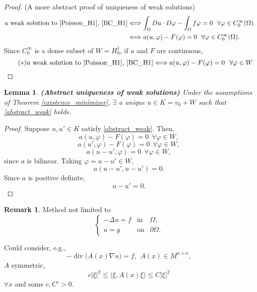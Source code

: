 \documentclass[12pt]{article}
\DeclareMathOperator{\diver}{div}
\newtheorem{lemma}{Lemma}[section]
\theoremstyle{definition}
\newtheorem*{remark}{Remark}
\begin{document}
\begin{proof}
(A more abstract proof of uniqueness of weak solutions)
\begin{align*}
u\text{ weak solution to \eqref{Poisson_H1}, \eqref{BC_H1}}&\Longleftrightarrow\int_{\Omega}Du\cdot D\varphi-\int_{\Omega}f\varphi=0\ \ \forall\varphi\in C_0^{\infty}(\Omega)\\
&\Longleftrightarrow a(u,\varphi)-F(\varphi)=0\ \ \forall\varphi\in C_0^{\infty}(\Omega).
\end{align*}
Since $C_0^{\infty}$ is a dense subset of $W=H_0^1$, if $a$ and $F$ are continuous,
\begin{equation}\tag{$*$}\label{abstract_weak}
u\text{ weak solution to \eqref{Poisson_H1}, \eqref{BC_H1}}\Longleftrightarrow a(u,\varphi)-F(\varphi)=0\ \ \forall\varphi\in W
\end{equation}
\end{proof}

\begin{lemma}\label{abstract_uniqueness}
\emph{\textbf{(Abstract uniqueness of weak solutions)}} Under the assumptions of Theorem \ref{existence_minimizer}, $\exists$ a unique $u\in K=v_0+W$ such that \eqref{abstract_weak} holds.
\end{lemma}

\begin{proof}
Suppose $u,u'\in K$ satisfy \eqref{abstract_weak}. Then,
\[a(u,\varphi)-F(\varphi)=0\ \ \forall\varphi\in W,\]
\[a(u',\varphi)-F(\varphi)=0\ \ \forall\varphi\in W,\]
\[a(u-u',\varphi)=0\ \ \forall\varphi\in W,\]
since $a$ is bilinear. Taking $\varphi=u-u'\in W$,
\[a(u-u',u-u')=0.\]
Since $a$ is positive definite,
\[u-u'=0.\]
\end{proof}

\begin{remark}
Method not limited to
\[\left\{\begin{array}{rcl}-\Delta u=f&\text{in}&\Omega,\\u=g&\text{on}&\partial\Omega.\end{array}\right.\]

Could consider, e.g.,
\[-\diver\big(A(x)\nabla u\big)=f,\ \ A(x)\in M^{n\times n},\]
$A$ symmetric,
\[c|\xi|^2\leq\langle\xi,A(x)\xi\rangle\leq C|\xi|^2\]
$\forall x$ and some $c,C'>0$.
\end{remark}
\end{document}
